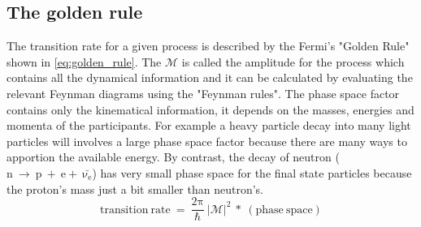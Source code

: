 \subsection{The golden rule}\label{subsubsec:golden_rule}
The transition rate for a given process is described by the Fermi's "Golden Rule" shown in \ref{eq:golden_rule}. The $\mathcal{M}$ is called the amplitude for the process which contains all the dynamical information and it can be calculated by evaluating the relevant Feynman diagrams using the "Feynman rules". The phase space factor contains only the kinematical information, it depends on the masses, energies and momenta of the participants. For example a heavy particle decay into many light particles will involves a large phase space factor because there are many ways to apportion the available energy. By contrast, the decay of neutron ($\mathrm{n~\rightarrow~p~+~e+~\bar{\nu_{e}}}$) has very small phase space for the final state particles because the proton's mass just a bit smaller than neutron's.
\begin{equation}
\mathrm{transition~rate~=~\frac{2\pi}{\hbar}~|\mathcal{M}|^{2}~*~(phase~space)}
\label{eq:golden_rule}
\end{equation}
